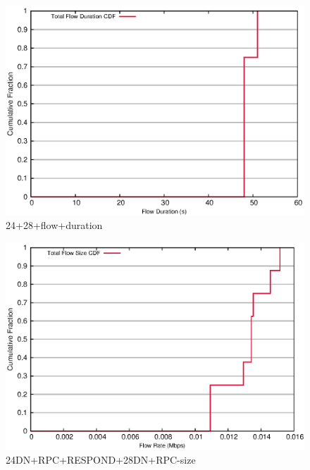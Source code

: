 \documentclass[landscape]{article}
\begin{document}

\begin{figure}[!hbt]
\centering
\includegraphics[width=1\textwidth]{24_28_flow_duration.eps}
\caption{24+28+flow+duration}
\end{figure}


\newpage

\begin{figure}[!hbt]
\centering
\includegraphics[width=1\textwidth]{24_28_flow_size.eps}
\caption{24DN+RPC+RESPOND+28DN+RPC-size}
\end{figure}


\newpage
\end{document}
